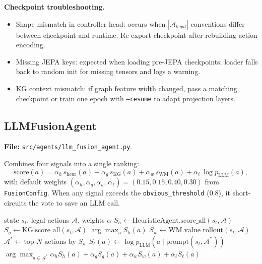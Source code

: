 \documentclass[11pt,a4paper]{article}
\begin{document}
\medskip\noindent\textbf{Checkpoint troubleshooting.}
\begin{itemize}[leftmargin=1.2em, itemsep=1pt]
      \item Shape mismatch in controller head: occurs when $|\mathcal{A}_{legal}|$ conventions differ between checkpoint and runtime. Re-export checkpoint after rebuilding action encoding.
      \item Missing JEPA keys: expected when loading pre-JEPA checkpoints; loader falls back to random init for missing tensors and logs a warning.
      \item KG context mismatch: if graph feature width changed, pass a matching checkpoint or train one epoch with \texttt{--resume} to adapt projection layers.
\end{itemize}

\subsection{LLMFusionAgent}
\textbf{File:} \texttt{src/agents/llm\_fusion\_agent.py}.

Combines four signals into a single ranking:
%
\begin{equation}
\text{score}(a) =
   \alpha_h\, s_{\text{heur}}(a)
 + \alpha_g\, s_{\text{KG}}(a)
 + \alpha_w\, s_{\text{WM}}(a)
 + \alpha_\ell\, \log p_{\text{LLM}}(a),
\end{equation}
%
with default weights $(\alpha_h, \alpha_g, \alpha_w, \alpha_\ell) =
(0.15, 0.15, 0.40, 0.30)$ from \texttt{FusionConfig}.  When any signal
exceeds the \texttt{obvious\_threshold} ($0.8$), it short-circuits the
vote to save an LLM call.

\begin{algorithm}[h]
\caption{LLM-Fusion turn (simplified)}
\begin{algorithmic}[1]
\Require state $s_t$, legal actions $\mathcal{A}$, weights $\alpha$
\State $S_h \gets \text{HeuristicAgent.score\_all}(s_t, \mathcal{A})$
\State $S_g \gets \text{KG.score\_all}(s_t, \mathcal{A})$
 \Return $\arg\max_a S_h(a)$ \EndIf
\State $S_w \gets \text{WM.value\_rollout}(s_t, \mathcal{A})$
\State $\mathcal{A}^* \gets \text{top-}N\text{ actions by }S_w$
\State $S_\ell(a) \gets \log p_{\text{LLM}}(a \mid \text{prompt}(s_t, \mathcal{A}^*))$
\State \Return $\arg\max_{a \in \mathcal{A}^*}
        \alpha_h S_h(a) + \alpha_g S_g(a) + \alpha_w S_w(a) + \alpha_\ell S_\ell(a)$
\end{algorithmic}
\end{algorithm}
\end{document}
